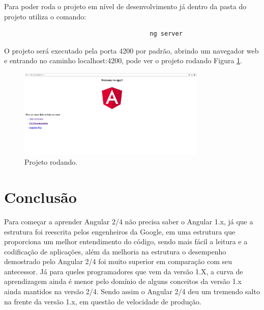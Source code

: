 \documentclass[12pt]{article}
\begin{document}
Para poder roda o projeto em nível de desenvolvimento já dentro da pasta do projeto utiliza o comando: 
	\begin{verbatim}
	                                    ng server
	\end{verbatim}
	
O projeto será executado pela porta 4200 por padrão, abrindo um navegador web e entrando no caminho localhost:4200, pode ver o projeto rodando Figura \ref{fig:Esta}. 	


\begin{figure}[H]
	\centering
	\includegraphics[width=0.8\textwidth]{imagens/Angula2.png}
	\caption{Projeto rodando.}
	\label{fig:Esta}
	
\end{figure}

\section*{Conclusão}

Para começar a aprender Angular 2/4 não precisa saber o Angular 1.x, já que a estrutura foi reescrita pelos engenheiros da Google, em uma estrutura que proporciona um melhor entendimento do código, sendo mais fácil a leitura e a codificação de aplicações, além da melhoria na estrutura o desempenho demostrado pelo Angular 2/4 foi muito superior em comparação com seu antecessor. Já para queles programadores que vem da versão 1.X, a curva de aprendizagem ainda é menor pelo domínio de alguns conceitos da versão 1.x ainda mantidos na versão 2/4. Sendo assim o Angular 2/4 deu um tremendo salto na frente da versão 1.x, em questão de velocidade de produção.
 


\end{document}

